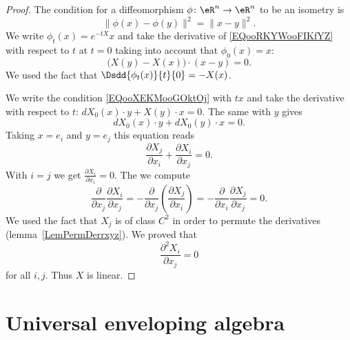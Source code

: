 \begin{proof}
    The condition for a diffeomorphism \( \phi\colon \eR^n\to \eR^n\) to be an isometry is
    \begin{equation}        \label{EQooRKYWooFIKfYZ}
        \| \phi(x)- \phi(y) \|^2=\| x-y \|^2.
    \end{equation}
    We write \( \phi_t(x)= e^{-tX}x\) and take the derivative of \eqref{EQooRKYWooFIKfYZ} with respect to \( t\) at \( t=0\) taking into account that \( \phi_0(x)=x\):
    \begin{equation}        \label{EQooXEKMooGOktOj}
        \big( X(y)-X(x) \big)\cdot (x-y)=0.
    \end{equation}
    We used the fact that \( \Dsdd{ \phi_t(x) }{t}{0}=-X(x)\).

    We write the condition \eqref{EQooXEKMooGOktOj} with \( tx\) and take the derivative with respect to \( t\): \( dX_0(x)\cdot y+X(y)\cdot x=0\). The same with \( y\) gives
    \begin{equation}
        dX_0(x)\cdot y+dX_0(y)\cdot x=0.
    \end{equation}
    Taking \( x=e_i\) and \( y=e_j\) this equation reads
    \begin{equation}
        \frac{ \partial X_j }{ \partial x_i }+\frac{ \partial X_i }{ \partial x_j }=0.
    \end{equation}
    With \( i=j\) we get \( \frac{ \partial X_i }{ \partial x_i }=0\). The we compute
    \begin{equation}
        \frac{ \partial  }{ \partial x_j }\frac{ \partial X_i }{ \partial x_j }=-\frac{ \partial  }{ \partial x_j }\left( \frac{ \partial X_j }{ \partial x_i } \right)=-\frac{ \partial  }{ \partial x_i }\frac{ \partial X_j }{ \partial x_j }=0.
    \end{equation}
    We used the fact that \( X_j\) is of class \( C^2\) in order to permute the derivatives (lemma~\ref{LemPermDerrxyz}). We proved that
    \begin{equation}
        \frac{ \partial^2 X_i  }{ \partial x_j }=0
    \end{equation}
    for all \( i,j\). Thus \( X\) is linear.
\end{proof}

\section{Universal enveloping algebra}  \label{subsec:env_alg}


